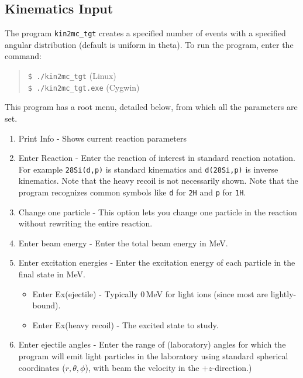 \subsection{Kinematics Input}
\label{kin_out}
The program \texttt{kin2mc\_tgt} creates a specified number of events with a specified angular distribution (default is uniform in theta).   To run the program, enter the command: 
\begin{quote}
\texttt{{\color{green}\$} ./kin2mc\_tgt} (Linux) \\
\texttt{{\color{green}\$} ./kin2mc\_tgt.exe} (Cygwin)
\end{quote}
This program has a root menu, detailed below, from which all the parameters are set.
\vspace{-1.0\baselineskip}
\begin{singlespace}
\begin{enumerate}
\setlength{\itemsep}{0pt}	
\setlength{\parskip}{0pt}
\setlength{\parsep}{0pt}
\addtocounter{enumi}{-1}	
	\item \textsf{Print Info} - Shows current reaction parameters
	\item \textsf{Enter Reaction} - Enter the reaction of interest in standard reaction notation. For example \texttt{28Si(d,p)} is standard kinematics and \texttt{d(28Si,p)} is inverse kinematics.  Note that the heavy recoil is not necessarily shown. Note that the program recognizes common symbols like \texttt{d} for \texttt{2H} and \texttt{p} for \texttt{1H}.
	\item \textsf{Change one particle} - This option lets you change one particle in the reaction without rewriting the entire reaction.
	\item \textsf{Enter beam energy} - Enter the total beam energy in MeV.
	\item \textsf{Enter excitation energies} - Enter the excitation energy of each particle in the final state in MeV. 
		\begin{itemize}
			\setlength{\itemsep}{0pt}
  		\setlength{\parskip}{0pt}
  		\setlength{\parsep}{0pt}
			\item \textsf{Enter Ex(ejectile)} - Typically 0\,MeV for light ions (since most are lightly-bound).
			\item \textsf{Enter Ex(heavy recoil)} - The excited state to study.
		\end{itemize}
	\item \textsf{Enter ejectile angles} - Enter the range of (laboratory) angles for which the program will emit light particles in the laboratory using standard spherical coordinates ($r,\theta,\phi$), with beam the velocity in the $+z$-direction.)

\end{enumerate}
\end{singlespace}
